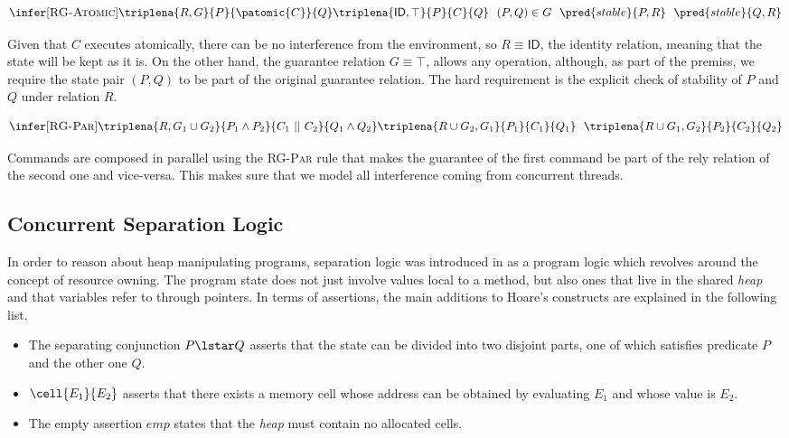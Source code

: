 \[
\infer[\textsc{RG-Atomic}]
{
	\triplena{R, G}{P}{\patomic{C}}{Q}
}
{
	\triplena{\mathsf{ID}, \top}{P}{C}{Q}
	\ \
	(P, Q) \in G
	\ \
	\pred{stable}{P, R}
	\ \
	\pred{stable}{Q, R}
}
\]

Given that $C$ executes atomically, there can be no interference from the environment, so $R \equiv \mathsf{ID}$, the identity relation, meaning that the state will be kept as it is. On the other hand, the guarantee relation $G \equiv \top$, allows any operation, although, as part of the premiss, we require the state pair $(P, Q)$ to be part of the original guarantee relation. The hard requirement is the explicit check of stability of $P$ and $Q$ under relation $R$.

\[
\infer[\textsc{RG-Par}]
{
	\triplena{R, G_1 \cup G_2}{P_1 \land P_2}{C_1\ ||\ C_2}{Q_1 \land Q_2}
}
{
	\triplena{R \cup G_2, G_1}{P_1}{C_1}{Q_1}
	\ \
	\triplena{R \cup G_1, G_2}{P_2}{C_2}{Q_2}
}
\]

Commands are composed in parallel using the \textsc{RG-Par} rule that makes the guarantee of the first command be part of the rely relation of the second one and vice-versa. This makes sure that we model all interference coming from concurrent threads.

\subsection{Concurrent Separation Logic}

In order to reason about heap manipulating programs, separation logic was introduced in \cite{seplogic} as a program logic which revolves around the concept of resource owning. The program state does not just involve values local to a method, but also ones that live in the shared \textit{heap} and that variables refer to through pointers. In terms of assertions, the main additions to Hoare's constructs are explained in the following list.
\begin{itemize}
\item The separating conjunction $P \lstar Q$ asserts that the state can be divided into two disjoint parts, one of which satisfies predicate $P$ and the other one $Q$.
\item $\cell{E_1}{E_2}$ asserts that there exists a memory cell whose address can be obtained by evaluating $E_1$ and whose value is $E_2$.
\item The empty assertion $emp$ states that the \textit{heap} must contain no allocated cells.
\end{itemize}

